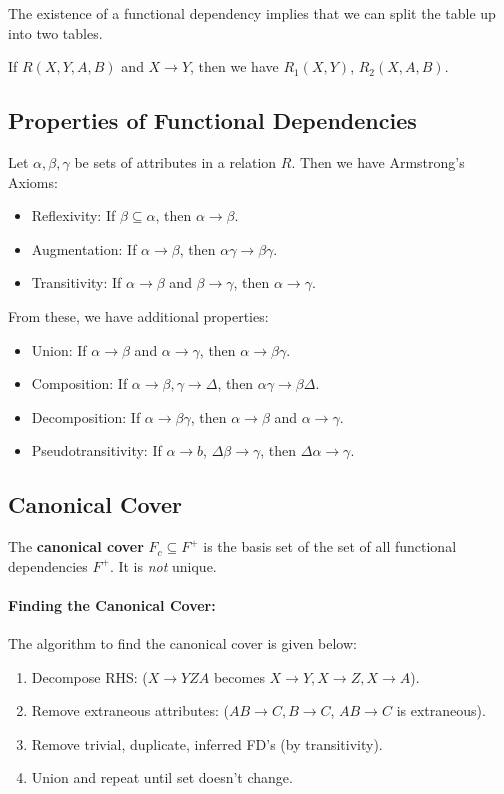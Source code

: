 \documentclass{report}
\newenvironment{definition}[1]{\begin{tcolorbox}[title={Definition: #1}]}{\end{tcolorbox}}
\newenvironment{example}{\begin{tcolorbox}[title={Example},colback=green!5!white,colframe=black!75!green]}{\end{tcolorbox}}
\renewcommand{\bf}[1]{\textbf{{#1}}}
\renewcommand{\it}[1]{\textit{{#1}}}
\begin{document}
The existence of a functional dependency implies that we can split the table up
into two tables.
\begin{example}
    If $R(X, Y, A, B)$ and $X \to Y$, then we have $R_1(X, Y)$, $R_2(X, A, B)$.
\end{example}

\renewcommand{\a}{\alpha}
\renewcommand{\b}{\beta}
\renewcommand{\d}{\delta}
\newcommand{\g}{\gamma}
\newcommand{\D}{\Delta}
\newpage
\subsection{Properties of Functional Dependencies}
Let $\a, \b, \g$ be sets of attributes in a relation $R$. Then we have
Armstrong's Axioms:
\begin{itemize}[label=$\to$]
    \item Reflexivity: If $\b \subseteq \a$, then $\a \to \b$.
    \item Augmentation: If $\a \to \b$, then $\a\g \to \b\g$.
    \item Transitivity: If $\a \to \b$ and $\b \to \g$, then $\a \to \g$.
\end{itemize}
From these, we have additional properties:
\begin{itemize}[label=$\to$]
    \item Union: If $\a \to \b$ and $\a \to \g$, then $\a \to \b \g$.
    \item Composition: If $\a \to \b, \g \to \Delta$, then $\a \g \to \b \Delta$.
    \item Decomposition: If $\a \to \b \g$, then $\a \to \b$ and $\a \to \g$.
    \item Pseudotransitivity: If $\a \to b$, $\Delta \b \to \g$, then $\Delta \a \to \g$.
\end{itemize}

\subsection{Canonical Cover}
\begin{definition}{Canonical Cover}
    The \bf{canonical cover} $F_c \subseteq F^+$ is the basis set of the set of
    all functional dependencies $F^+$. It is \it{not} unique.
\end{definition}

\paragraph{Finding the Canonical Cover:} The algorithm to find the canonical
cover is given below:
\begin{enumerate}[label=(\arabic*)]
    \item Decompose RHS: ($X \to YZA$ becomes $X \to Y, X \to Z, X \to A$).
    \item Remove extraneous attributes: ($AB \to C, B \to C$, $AB \to C$ is extraneous).
    \item Remove trivial, duplicate, inferred FD's (by transitivity).
    \item Union and repeat until set doesn't change.
\end{enumerate}
\end{document}
